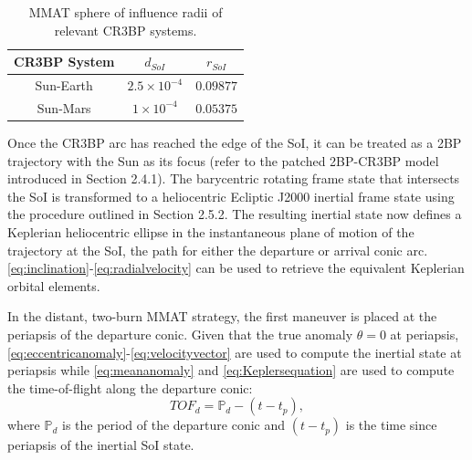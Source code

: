 \begin{table}[ht]
    \centering
    \caption{MMAT sphere of influence radii of relevant CR3BP systems.}
    \begin{tabular}{|c|c|c|}
        \hline
        \textbf{CR3BP System}   &   \boldmath$d_{SoI}$  &   \boldmath$r_{SoI}$  \\  \hline
        Sun-Earth               &   $2.5\times10^{-4}$  &   $0.09877$           \\  \hline
        Sun-Mars                &   $1\times10^{-4}$    &   $0.05375$           \\  \hline
    \end{tabular}
    \label{tab:SoI}
\end{table}

Once the CR3BP arc has reached the edge of the SoI, it can be treated as a 2BP trajectory with the
Sun as its focus (refer to the patched 2BP-CR3BP model introduced in Section 2.4.1). The
barycentric rotating frame state that intersects the SoI is transformed to a heliocentric Ecliptic
J2000 inertial frame state using the procedure outlined in Section 2.5.2. The resulting inertial
state now defines a Keplerian heliocentric ellipse in the instantaneous plane of motion of the
trajectory at the SoI, the path for either the departure or arrival conic arc.
\cref{eq:inclination}-\cref{eq:radialvelocity} can be used to retrieve the equivalent Keplerian
orbital elements.

In the distant, two-burn MMAT strategy, the first maneuver is placed at the periapsis of the
departure conic. Given that the true anomaly $\theta=0$ at periapsis,
\cref{eq:eccentricanomaly}-\cref{eq:velocityvector} are used to compute the inertial state at
periapsis while \cref{eq:meananomaly} and \cref{eq:Keplersequation} are used to compute the
time-of-flight along the departure conic:
\begin{equation}
    TOF_{d}=\mathbb{P}_{d}-(t-t_{p}),
    \label{eq:departureTOF}
\end{equation}
where $\mathbb{P}_{d}$ is the period of the departure conic and $(t-t_{p})$ is the time since
periapsis of the inertial SoI state.

